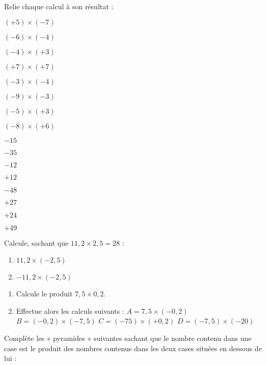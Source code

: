 \begin{exercice}Relie chaque calcul à son résultat :
\begin{colitemize}{2}
\item $(+5) \times (-7)$
\item $(-6) \times (-4)$
\item $(-4) \times (+3)$
\item $(+7)	\times (+7)$
\item $(-3) \times (-4)$
\item $(-9) \times (-3)$
\item $(-5) \times (+3)$
\item $(-8) \times (+6)$
\item $-15$
\item $-35$
\item $-12$
\item $+12$
\item $-48$
\item $+27$
\item $+24$
\item $+49$
\end{colitemize}
\end{exercice}



\begin{exercice}Calcule, sachant que $11,2 \times 2,5 = 28$ :
\begin{enumerate}
\item $11,2 \times (-2,5)$
\item $-11,2 \times (-2,5)$
\end{enumerate}
\end{exercice}



\begin{exercice}
\begin{enumerate}
\item Calcule le produit $7,5 \times 0,2$.
\item Effectue alors les calculs suivants :
\subitem $A = 7,5 \times (-0,2)$
\subitem $B = (-0,2) \times (-7,5)$
\subitem $C = (-75) \times (+0,2)$
\subitem $D = (-7,5) \times (-20)$
\end{enumerate}
\end{exercice}



\begin{exercice}Complète les « pyramides » suivantes sachant que le nombre contenu dans une case est le produit des nombres contenus dans les deux cases situées en dessous de lui :
\end{exercice}


